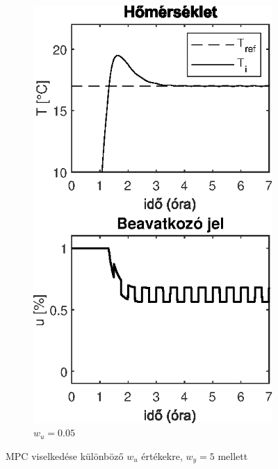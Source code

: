 \begin{figure}[H]
\begin{subfigure}[t]{0.32\textwidth}
	\includegraphics[width=\textwidth]{figures/realsys/mpc-wu-005}
	\caption{$w_u=0.05$}
	\label{fig:mpc-wu-005}
\end{subfigure}
\caption{MPC viselkedése különböző $w_u$ értékekre, $w_y=5$ mellett}
\label{fig:mpc-wu}
\end{figure}
\pagebreak

